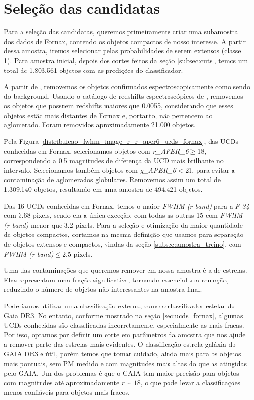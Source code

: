 \section{Seleção das candidatas}\label{sec:selecao_candidatas}
Para a seleção das candidatas, queremos primeiramente criar uma subamostra dos dados de Fornax, contendo os objetos compactos de nosso interesse. A partir dessa amostra, iremos selecionar pelas probabilidades de serem extensos (classe 1). Para amostra inicial, depois dos cortes feitos da seção \ref{subsec:cuts}, temos um total de 1.803.561 objetos com as predições do classificador. 

A partir de \cite{Su_2021}, removemos os objetos confirmados espectroscopicamente como sendo do background. Usando o catálogo de redshifts espectroscópicos de \cite{Lima_2024}, removemos os objetos que possuem redshifts maiores que 0.0055, considerando que esses objetos estão mais distantes de Fornax e, portanto, não pertencem ao aglomerado. Foram removidos aproximadamente 21.000 objetos.

Pela Figura \ref{distribuicao_fwhm_image_r_r_aper6_ucds_fornax}, das UCDs conhecidas em Fornax, selecionamos objetos com \textit{r\_APER\_6}$\geq$18, correspondendo a 0.5 magnitudes de diferença da UCD mais brilhante no intervalo. Selecionamos também objetos com \textit{g\_APER\_6}$<$21, para evitar a contaminação de aglomerados globulares. Removemos assim um total de 1.309.140 objetos, resultando em uma amostra de 494.421 objetos.

Das 16 UCDs conhecidas em Fornax, temos o maior \textit{FWHM (r-band)} para a \textit{F-34} com 3.68 pixels, sendo ela a única exceção, com todas as outras 15 com \textit{FWHM (r-band)} menor que 3.2 pixels. Para a seleção e otimização da maior quantidade de objetos compactos, cortamos na mesma definição que usamos para separação de objetos extensos e compactos, vindas da seção \ref{subsec:amostra_treino}, com \textit{FWHM (r-band)}$\leq$2.5 pixels.

Uma das contaminações que queremos remover em nossa amostra é a de estrelas. Elas representam uma fração significativa, tornando essencial sua remoção, reduzindo o número de objetos não interessantes na amostra final.

Poderíamos utilizar uma classificação externa, como o classificador estelar do Gaia DR3. No entanto, conforme mostrado na seção \ref{sec:ucds_fornax}, algumas UCDs conhecidas são classificadas incorretamente, especialmente as mais fracas. Por isso, optamos por definir um corte em parâmetros da amostra que nos ajude a remover parte das estrelas mais evidentes. O classificação estrela-galáxia do GAIA DR3 é útil, porém temos que tomar cuidado, ainda mais para os objetos mais pontuais, sem \ac{PM} medido e com magnitudes mais altas do que as atingidas pelo GAIA. Um dos problemas é que o GAIA tem maior precisão para objetos com magnitudes até aproximadamente $r \sim 18$, o que pode levar a classificações menos confiáveis para objetos mais fracos.


